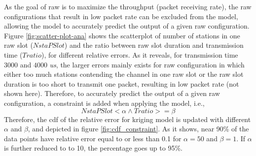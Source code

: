  
 As the goal of \gls{raw} is to maximize the throughput (packet receiving rate), the \gls{raw} configurations that result in low packet rate can be excluded from the model, allowing the model to accurately predict the output of a given \gls{raw} configuration. 
Figure \ref{fig:scatter-plot-ana} shows the scatterplot of number of stations in one \gls{raw} slot ($NstaPSlot$) and the ratio between \gls{raw} slot duration and transmission time ($Tratio$), for different relative errors. As it reveals, for transmission time $3000$ and $4000$ \textit{us}, the larger errors mainly exists for \gls{raw} configuration in which either too much stations contending the channel in one \gls{raw} slot or the \gls{raw} slot duration is too short to transmit one packet, resulting in low packet rate (not shown here). Therefore, to accurately predict the output of a given \gls{raw} configuration, a constraint is added when applying the model, i.e., 
\begin{equation} \label{eq:constraint}
NstaPSlot < \alpha \wedge Tratio >= \beta
\end{equation}
Therefore, the \gls{cdf} of the relative error for kriging model is updated with different $\alpha$ and $\beta$, and depicted in figure \ref{fig:cdf_constraint}. As it shows, near 90\% of the data points have relative error equal to or less than 0.1 for $\alpha = 50$ and $\beta = 1$. If $\alpha$ is further reduced to  to 10, the percentage goes up to 95\%. 






